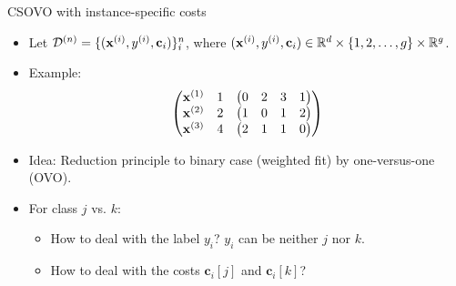 \documentclass[11pt,compress,t,notes=noshow, xcolor=table]{beamer}
\newcommand{\cv}{\mathbf{c}}    %
\begin{document}
\begin{vbframe}{CSOVO with instance-specific costs}
    \footnotesize
    \begin{itemize}
        \footnotesize

        \item Let $\D^{(n)} = \{(\xi, \yi, \cv_i)\}_i^n$, where $(\xi, \yi, \cv_i) \in \mathbb{R}^d \times \{1, 2, \ldots, g\} \times \mathbb{R}^g$. 
        \vspace{5pt}    
        \item Example:
        \vspace{5pt}
        \begin{equation*}
            \begin{aligned}
                \begin{pmatrix} 
                    \mathbf{x}^{(1)} & 1 & \begin{pmatrix} 0 & 2 & 3 & 1 \end{pmatrix} \\
                    \mathbf{x}^{(2)} & 2 & \begin{pmatrix} 1 & 0 & 1 & 2 \end{pmatrix} \\
                    \mathbf{x}^{(3)} & 4 & \begin{pmatrix} 2 & 1 & 1 & 0 \end{pmatrix} \\
                 \end{pmatrix}
            \end{aligned}
        \end{equation*}
        \vspace{5pt}
        \vspace{5pt}
        
        \item Idea: Reduction principle to binary case (weighted fit) by one-versus-one (OVO). 
        
        \vspace{5pt}
        
        \item For class $j$ vs. $k$:
        \begin{itemize}
            \footnotesize
            \item How to deal with the label $y_i$? $y_i$ can be neither $j$ nor $k$.
            \vspace{5pt}
            
            \item How to deal with the costs $\cv_i[j]$ and $\cv_i[k]$?
        \end{itemize}
            
    \end{itemize}
\end{vbframe}
\end{document}
